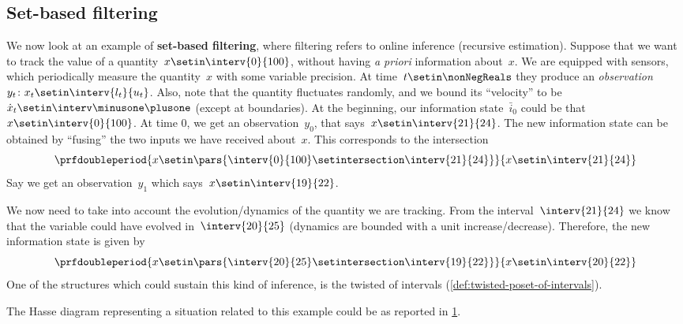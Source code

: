 \subsection{Set-based filtering}
We now look at an example of \textbf{set-based filtering}, where filtering refers to online inference (recursive estimation).
Suppose that we want to track the value of a quantity~$x\setin \interv{0}{100}$, without having \emph{a priori} information about~$x$.
We are equipped with sensors, which periodically measure the quantity~$x$ with some variable precision.
At time~$t\setin \nonNegReals$ they produce an \emph{observation}~$y_t\colon x_t\setin \interv{l_t}{u_t}$.
Also, note that the quantity fluctuates randomly, and we bound its ``velocity'' to be~$\dot{x}_t\setin \interv\minusone\plusone$ (except at boundaries).
At the beginning, our information state~$\bar{i}_0$ could be that~$x\setin \interv{0}{100}$.
At time 0, we get an observation~$y_0$, that says~$x\setin \interv{21}{24}$.
The new information state can be obtained by ``fusing'' the two inputs we have received about~$x$.
This corresponds to the intersection
\begin{equation}\label{eq:filtering-2}
    \prfdoubleperiod{
        x\setin \pars{ \interv{0}{100} \setintersection \interv{21}{24}}
    }{
        x\setin \interv{21}{24}
    }
\end{equation}
Say we get an observation~$y_1$ which says~$x\setin \interv{19}{22}$.
\begin{figure}
    \centering
    \caption{}
    \label{fig:hasse_filtering}
\end{figure}
We now need to take into account the evolution/dynamics of the quantity we are tracking.
From the interval~$\interv{21}{24}$ we know that the variable could have evolved in~$\interv{20}{25}$ (dynamics are bounded with a unit increase/decrease).
Therefore, the new information state is given by
\begin{equation}\label{eq:filtering-3}
    \prfdoubleperiod{
        x\setin \pars{ \interv{20}{25} \setintersection \interv{19}{22}}
    }{
        x\setin \interv{20}{22}
    }
\end{equation}
One of the structures which could sustain this kind of inference, is the twisted  of intervals (\cref{def:twisted-poset-of-intervals}).

The Hasse diagram representing a situation related to this example could be as reported in \cref{fig:hasse_filtering}.

